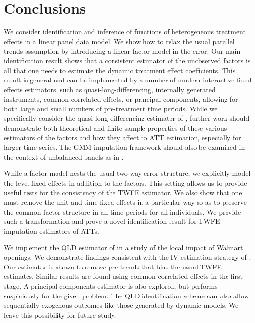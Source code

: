 \documentclass[12pt]{article}
\begin{document}
\section{Conclusions}\label{sec:conclusion}

We consider identification and inference of functions of heterogeneous treatment effects in a linear panel data model. We show how to relax the usual parallel trends assumption by introducing a linear factor model in the error. Our main identification result shows that a consistent estimator of the unobserved factors is all that one needs to estimate the dynamic treatment effect coefficients. This result is general and can be implemented by a number of modern interactive fixed effects estimators, such as quasi-long-differencing, internally generated instruments, common correlated effects, or principal components, allowing for both large and small numbers of pre-treatment time periods. While we specifically consider the quasi-long-differencing estimator of \citet{Ahn_Lee_Schmidt_2013}, further work should demonstrate both theoretical and finite-sample properties of these various estimators of the factors and how they affect to ATT estimation, especially for larger time series. The GMM imputation framework should also be examined in the context of unbalanced panels as in \citet{Rai_2022}. 

While a factor model nests the usual two-way error structure, we explicitly model the level fixed effects in addition to the factors. This setting allows us to provide useful tests for the consistency of the TWFE estimator. We also show that one must remove the unit and time fixed effects in a particular way so as to preserve the common factor structure in all time periods for all individuals. We provide such a transformation and prove a novel identification result for TWFE imputation estimators of ATTs.

We implement the QLD estimator of \citet{Ahn_Lee_Schmidt_2013} in a study of the local impact of Walmart openings. We demonstrate findings consistent with the IV estimation strategy of \citet{basker2005job}.  Our estimator is shown to remove pre-trends that bias the usual TWFE estimates. Similar results are found using common correlated effects in the first stage. A principal components estimator is also explored, but performs suspiciously for the given problem. The QLD identification scheme can also allow sequentially exogenous outcomes like those generated by dynamic models. We leave this possibility for future study. 
\end{document}

